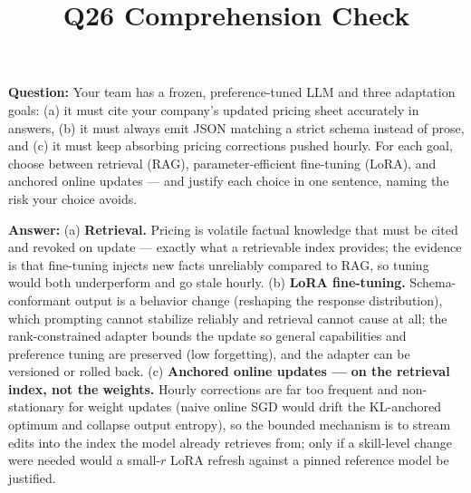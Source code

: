 \documentclass[11pt]{article}
\title{Q26 Comprehension Check}
\date{}
\begin{document}
\maketitle
\textbf{Question:} Your team has a frozen, preference-tuned LLM and three adaptation goals: (a) it must cite your company's updated pricing sheet accurately in answers, (b) it must always emit JSON matching a strict schema instead of prose, and (c) it must keep absorbing pricing corrections pushed hourly. For each goal, choose between retrieval (RAG), parameter-efficient fine-tuning (LoRA), and anchored online updates --- and justify each choice in one sentence, naming the risk your choice avoids.

\vspace{1em}
\textbf{Answer:}
(a) \textbf{Retrieval.} Pricing is volatile factual knowledge that must be cited and revoked on update --- exactly what a retrievable index provides; the evidence is that fine-tuning injects new facts unreliably compared to RAG, so tuning would both underperform and go stale hourly.
(b) \textbf{LoRA fine-tuning.} Schema-conformant output is a behavior change (reshaping the response distribution), which prompting cannot stabilize reliably and retrieval cannot cause at all; the rank-constrained adapter bounds the update so general capabilities and preference tuning are preserved (low forgetting), and the adapter can be versioned or rolled back.
(c) \textbf{Anchored online updates --- on the retrieval index, not the weights.} Hourly corrections are far too frequent and non-stationary for weight updates (naive online SGD would drift the KL-anchored optimum and collapse output entropy), so the bounded mechanism is to stream edits into the index the model already retrieves from; only if a skill-level change were needed would a small-$r$ LoRA refresh against a pinned reference model be justified.
\end{document}
